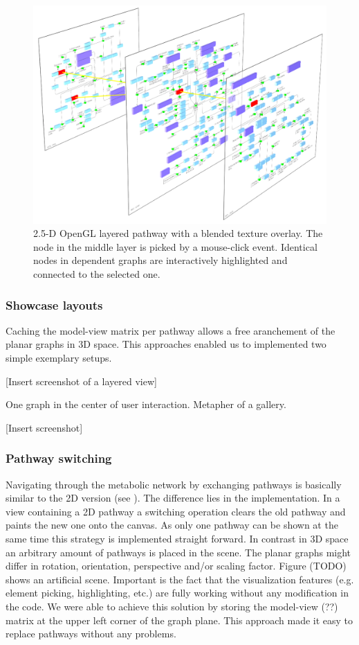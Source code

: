 \begin{figure}[ht]
  \centering
    \includegraphics[width=0.8\linewidth]{gfx/opengl_layered_pathway}
  \caption{2.5-D OpenGL layered pathway with a blended texture overlay. The node in the middle layer is picked by a mouse-click event. Identical nodes in dependent graphs are interactively highlighted and connected to the selected one.}
  \label{fig:opengl_layered_pathway}
\end{figure}

\subsubsection{Showcase layouts}

Caching the model-view matrix per pathway allows a free aranchement of the planar graphs in 3D space.
This approaches enabled us to implemented two simple exemplary setups.


[Insert screenshot of a layered view]


One graph in the center of user interaction. Metapher of a gallery.

[Insert screenshot]


\subsubsection{Pathway switching}

Navigating through the metabolic network by exchanging pathways is basically similar to the 2D version (see ). The difference lies in the implementation. In a view containing a 2D pathway a switching operation clears the old pathway and paints the new one onto the canvas. As only one pathway can be shown at the same time this strategy is implemented straight forward. In contrast in 3D space an arbitrary amount of pathways is placed in the scene. The planar graphs might differ in rotation, orientation, perspective and/or scaling factor. Figure (TODO) shows an artificial scene. Important is the fact that the visualization features (e.g. element picking, highlighting, etc.) are fully working without any modification in the code. We were able to achieve this solution by storing the model-view (??) matrix at the upper left corner of the graph plane. This approach made it easy to replace pathways without any problems.


